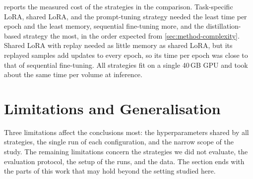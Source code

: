 \begin{table}[tb]
\centering
\caption[Measured cost of the strategies]{Measured cost of the strategies in the comparison (full training split, original task order, one run per strategy, one NVIDIA A100 40\,GB). Trainable param.: parameters set as trainable (\cref{sec:method-adaptation}). Epoch: mean time of one training epoch, including validation. Evaluation: median time per test volume, including data loading and text encoding. Peak GPU mem.: maximum over training and evaluation.}
\label{tab:ch6_compute}

\end{table}

 reports the measured cost of the strategies in the comparison.
Task-specific LoRA, shared LoRA, and the prompt-tuning strategy needed the least time per epoch and the least memory, sequential fine-tuning more, and the distillation-based strategy the most, in the order expected from \cref{sec:method-complexity}.
Shared LoRA with replay needed as little memory as shared LoRA, but its replayed samples add updates to every epoch, so its time per epoch was close to that of sequential fine-tuning.
All strategies fit on a single 40\,GB GPU and took about the same time per volume at inference.

\section{Limitations and Generalisation}
\label{sec:exp-limitations}

Three limitations affect the conclusions most: the hyperparameters shared by all strategies, the single run of each configuration, and the narrow scope of the study.
The remaining limitations concern the strategies we did not evaluate, the evaluation protocol, the setup of the runs, and the data.
The section ends with the parts of this work that may hold beyond the setting studied here.

